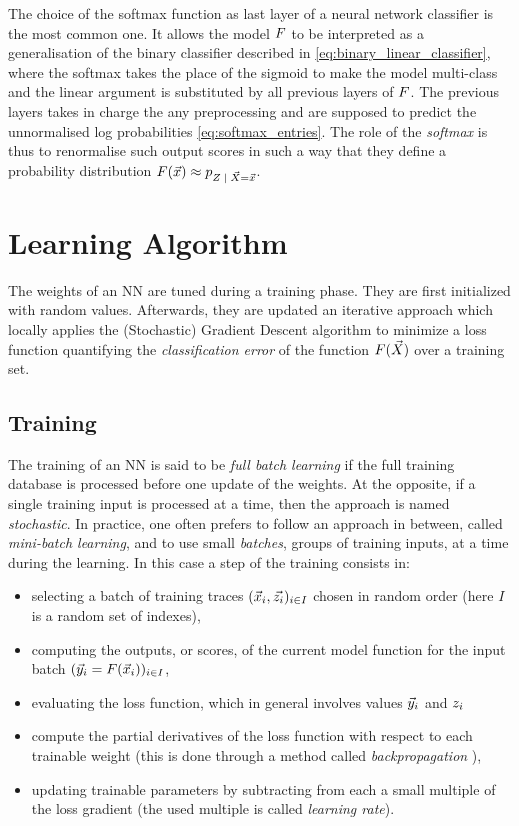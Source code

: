 The choice of the softmax function as last layer of a neural network classifier is the most common one. It allows the model $F$ to be interpreted as a generalisation of the binary classifier described in \eqref{eq:binary_linear_classifier}, where the softmax takes the place of the sigmoid to make the model multi-class and the linear argument is substituted by all previous layers of $F$. The previous layers takes in charge the any preprocessing and are supposed to predict the unnormalised log probabilities \eqref{eq:softmax_entries}. The role of the \emph{softmax} is thus to renormalise such output scores in such a way that they define a probability distribution $\MLmodel(\vLeakVec) \approx \pdf_{\given{\sensRandVar}{\vaLeakVec=\vLeakVec}}$. 

\section{Learning Algorithm}\label{sec:learningAlgorithm}
The weights of an NN are tuned during a training phase. They are first initialized with random values. Afterwards, they are updated  \via an
iterative approach which locally applies the (Stochastic) Gradient Descent
algorithm \cite{Goodfellow-et-al-2016} to minimize a loss function
quantifying the \emph{classification error} of the function
$F(\vec{X})$ over a training set.

\subsection{Training}\label{sec:training}
The training of an NN is said to be \emph{full batch learning} if
the full training database is processed before one update of the weights. At the opposite, if
a single training input is processed at a time, then the approach is named
\emph{stochastic}. In practice, one often prefers to follow an approach in
between, called \emph{mini-batch learning}, and to use small \emph{batches}, \ie
groups of training inputs, at a time during the learning. In this case a step of the training consists in: 
\begin{itemize}
\item selecting a batch of training traces $(\vec{x}_i, \vec{z_i})_{i\in I}$ chosen in random order (here $I$ is a random set of indexes),
\item computing the outputs, or scores, of the current model function for the input batch $(\vec{y}_i = F(\vec{x}_i))_{i\in I}$, 
\item evaluating the loss function, which in general involves values $\vec{y}_i$ and $z_i$
\item compute the partial derivatives of the loss function with respect to each trainable weight (this is done through a method called \emph{backpropagation} \cite{LeCun2012}),
\item updating trainable parameters by subtracting from each a small multiple of the loss gradient (the used multiple is called \emph{learning rate}).
\end{itemize}  

